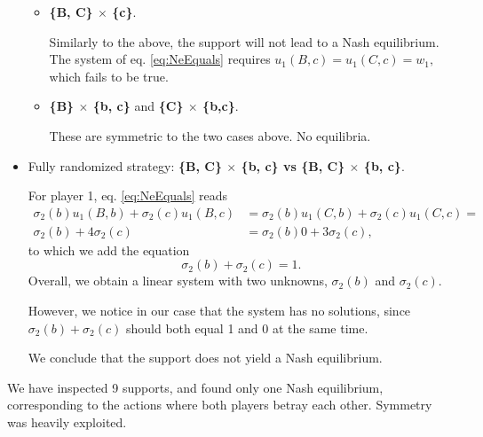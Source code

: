 \begin{example}
\begin{itemize}
\begin{itemize}
\item \textbf{\{B, C\} $\times$ \{c\}}.

Similarly to the above, the support will not lead to a Nash equilibrium. The system of eq. \ref{eq:NeEquals} requires $u_1(B,c) = u_1(C,c) = w_1, $ which fails to be true.

\item \textbf{\{B\} $\times$ \{b, c\}} and \textbf{\{C\} $\times$ \{b,c\}}.

These are  symmetric to the two cases above. No equilibria.

\end{itemize}
\item Fully randomized strategy: \textbf{\{B, C\} $\times$ \{b, c\} vs \{B, C\} $\times$ \{b, c\}}.

For player 1, eq. \ref{eq:NeEquals} reads
$$
\begin{aligned}
 \sigma_2(b)u_1(B,b) + \sigma_2(c)u_1(B,c) & = \sigma_2(b)u_1(C,b) + \sigma_2(c)u_1(C,c)= \\
 \sigma_2(b) + 4 \sigma_2(c) & = \sigma_2(b) 0 + 3 \sigma_2(c),
 \end{aligned}
$$
to which we add the equation
$$ \sigma_2(b) + \sigma_2(c) = 1.$$
Overall, we obtain a linear system with two unknowns, $\sigma_2(b)$ and $\sigma_2(c)$.

However, we notice in our case that the system has no solutions, since $\sigma_2(b) + \sigma_2(c)$ should both equal 1 and 0 at the same time.

We conclude that the support does not yield a Nash equilibrium.
\end{itemize}

We have inspected 9 supports, and found only one Nash equilibrium, corresponding to the actions where both players betray each other. Symmetry was heavily exploited.

\label{chap3:ex:pdilemma}
\end{example}

